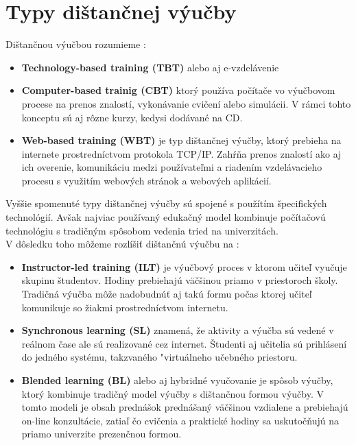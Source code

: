 \documentclass[10pt,oneside,slovak,a4paper]{article}
\begin{document}
\section{Typy dištančnej výučby}
Dištančnou výučbou rozumieme :
\begin{itemize}
	\item \textbf{Technology-based training (TBT)} alebo aj e-vzdelávenie\cite{WiktorzakKotowski}
	\item \label{CBT} \textbf{Computer-based trainig (CBT)} ktorý používa počítače vo výučbovom procese na prenos znalostí, vykonávanie cvičení alebo simulácii. V rámci tohto konceptu sú aj rôzne kurzy, kedysi dodávané na CD.\cite{WiktorzakKotowski}
	\item \label{WBT}\textbf{Web-based training (WBT)} je typ dištančnej výučby, ktorý prebieha na internete prostredníctvom protokola TCP/IP. Zahŕňa prenos znalostí ako aj ich overenie, komunikáciu medzi používateľmi a riadením vzdelávacieho procesu s využitím webových stránok a webových aplikácií.\cite{WiktorzakKotowski}
\end{itemize}
Vyššie spomenuté typy dištančnej výučby sú spojené s použítím špecifických technológií. 
Avšak najviac používaný edukačný model kombinuje počítačovú technológiu s tradičným spôsobom vedenia tried na univerzitách.\\ 
V dôsledku toho môžeme rozlíšiť dištančnú výučbu na :
\begin{itemize}
	\item \textbf{Instructor-led training (ILT)} je výučbový proces v ktorom učiteľ vyučuje skupinu študentov. Hodiny prebiehajú väčšinou priamo v priestoroch školy.
Tradičná výučba môže nadobudnúť aj takú formu počas ktorej učiteľ komunikuje so žiakmi prostredníctvom internetu.\cite{WiktorzakKotowski}
	\item \textbf{Synchronous learning (SL)} znamená, že aktivity a výučba sú vedené v reálnom čase ale sú realizované cez internet. \cite{WiktorzakKotowski}
	Študenti aj učitelia sú prihlásení do jedného systému, takzvaného "virtuálneho učebného priestoru.\cite{WiktorzakKotowski}
	\item \textbf{Blended learning (BL)} alebo aj hybridné vyučovanie je spôsob výučby, ktorý kombinuje tradičný model výučby s dištančnou formou výučby.
	V tomto modeli je obsah prednášok prednášaný väčšinou vzdialene a prebiehajú on-line konzultácie, zatiaľ čo cvičenia a praktické hodiny sa uskutočňujú na priamo univerzite prezenčnou formou.\cite{WiktorzakKotowski} 
\end{itemize}
\end{document}

